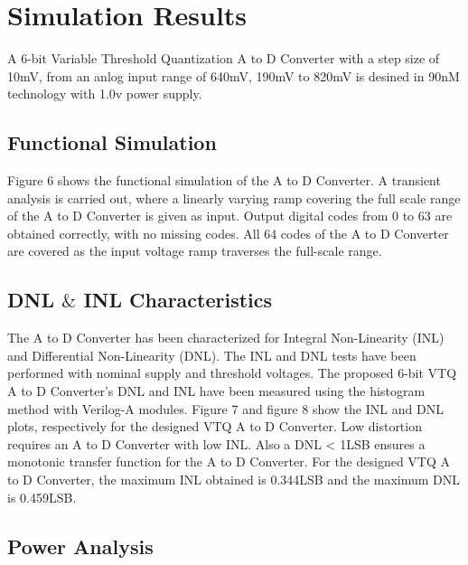 \section{Simulation Results}

\par
\hspace{1.2cm} A 6-bit Variable Threshold Quantization A to D Converter with a step size of 10mV, from an anlog input range of 640mV, 190mV to 820mV is desined in 90nM technology with 1.0v power supply. 

\subsection{Functional Simulation}

\par
\hspace{1.2cm}Figure 6 shows the functional simulation of the A to D Converter. A transient analysis is carried out, where a linearly varying ramp covering the full scale range of the A to D Converter is given as input. Output digital codes from 0 to 63 are obtained correctly, with no missing codes. All 64 codes of the A to D Converter are covered as the input voltage ramp traverses the full-scale range.

\subsection{DNL $\&$ INL Characteristics}

\par
\hspace{1.2cm}The A to D Converter has been characterized for Integral Non-Linearity (INL) and Differential Non-Linearity (DNL). The INL and DNL tests have been performed with nominal supply and threshold voltages. The proposed 6-bit VTQ A to D Converter's DNL and INL have been measured using the histogram method with Verilog-A modules. Figure 7 and figure 8 show the INL and DNL plots, respectively for the designed VTQ A to D Converter. Low distortion requires an A to D Converter with low INL. Also a DNL < 1LSB ensures a monotonic transfer function for the A to D Converter. For the designed VTQ A to D Converter, the maximum INL obtained is 0.344LSB and the maximum DNL is 0.459LSB. 

\subsection{Power Analysis}

